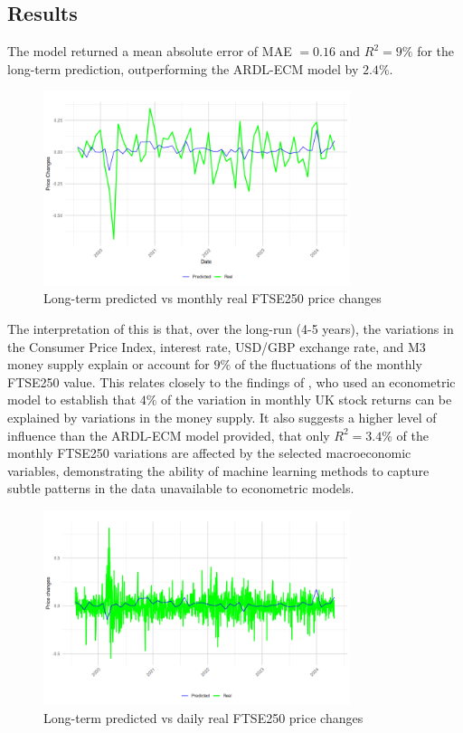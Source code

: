 \documentclass[11pt,a4paper]{article}
\newcommand{\citeboth}[1]{\citeauthor{#1} \citep{#1}}
\begin{document}
\subsection{Results}

The model returned a mean absolute error of MAE $=0.16$ and 
$R^2 = 9\%$ for the long-term prediction, outperforming the ARDL-ECM model by 
$2.4\%$.


\begin{figure}[h]
    \centering
    \includegraphics[width=0.8\textwidth]{long-term-monthly.png}
    \caption{Long-term predicted vs monthly real FTSE250 price changes}
    \label{fig:lmonthly}
\end{figure}

The interpretation of this is that, over the long-run (4-5 years), the variations in the 
Consumer Price Index, interest rate, USD/GBP exchange rate, and M3 money 
supply explain or account for $9\%$ of the fluctuations of the
monthly FTSE250 value. This relates closely to the findings of \citeboth{conover1999}, 
who used an econometric model to establish that $4\%$ of the variation in monthly UK stock returns can be 
explained by variations in the money supply. It also suggests a higher level of influence 
than the ARDL-ECM model provided, that only $R^2=3.4\%$ of the monthly FTSE250 variations 
are affected by the selected macroeconomic variables, demonstrating the ability of machine learning
methods to capture subtle patterns in the data unavailable to econometric models. 

\begin{figure}[h]
    \centering
    \includegraphics[width=0.8\textwidth]{long-term-daily.png}
    \caption{Long-term predicted vs daily real FTSE250 price changes}
    \label{fig:ldaily}
\end{figure}
\end{document}
